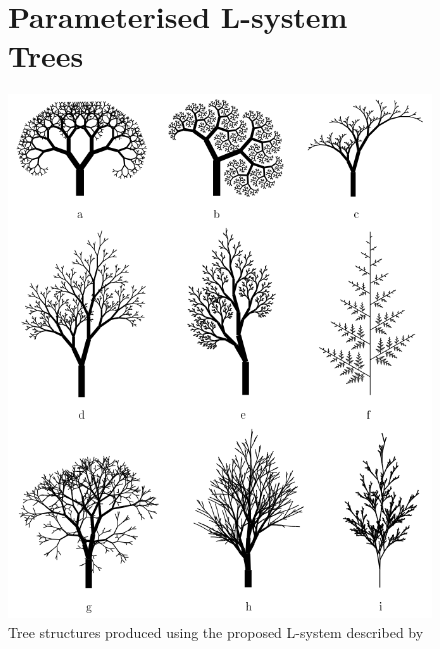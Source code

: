 \documentclass[final]{cmpreport}
\begin{document}
\appendix{}
\begin{figure}[ht]
    \section{Parameterised L-system Trees}
    \label{app:parameterised-lsystem-trees}
    \includegraphics[scale=0.7]{tree-lsystem-results.PNG} 
    \centering
    \captionsetup{justification=centering}
    \caption{Tree structures produced using the proposed L-system described by \cite{prusinkiewicz1996systems}}
    \label{fig:tree-lsystem-results}
\end{figure}
\end{document}
